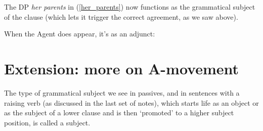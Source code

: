 \documentclass{article}
\begin{document}
The DP \emph{her parents} in (\ref{her_parents}) now functions as the grammatical subject of the clause (which lets it trigger the correct agreement, as we saw above).

When the Agent does appear, it's as an adjunct:
\begin{exe}
    \label{passive-tree}
\end{exe}


\section{Extension: more on A-movement}
The type of grammatical subject we see in passives, and in sentences with a raising verb (as discussed in the last set of notes), which starts life as an object or as the subject of a lower clause and is then `promoted' to a higher subject position, is called a  subject.
\end{document}

